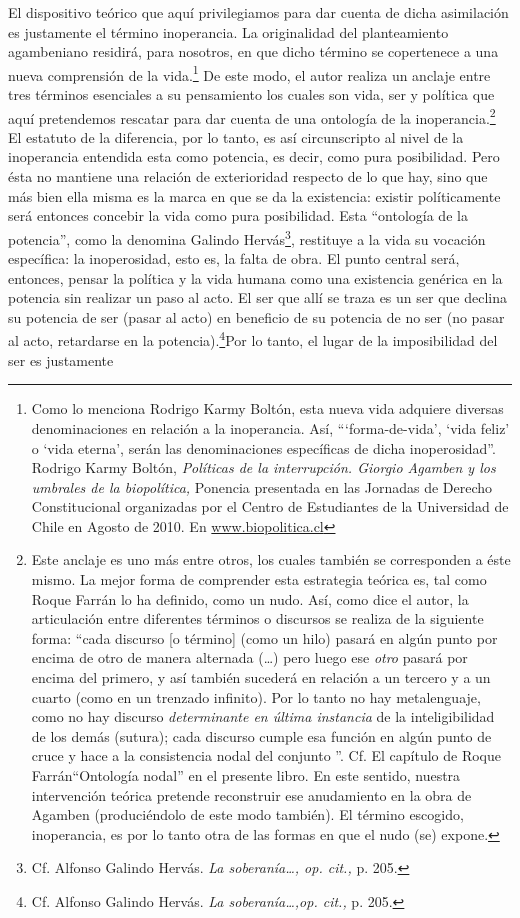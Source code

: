 El dispositivo teórico que aquí privilegiamos para dar cuenta de dicha asimilación es justamente el término inoperancia. La originalidad del planteamiento agambeniano residirá, para nosotros, en que dicho término se copertenece a una nueva comprensión de la vida.\footnote{Como lo menciona Rodrigo Karmy Boltón, esta nueva vida adquiere diversas denominaciones en relación a la inoperancia. Así, \enquote{\enquote{forma-de-vida}, \enquote{vida feliz} o \enquote{vida eterna}, serán las denominaciones específicas de dicha inoperosidad}. Rodrigo Karmy Boltón, \emph{Políticas de la interrupción. Giorgio Agamben y los umbrales de la biopolítica,} Ponencia presentada en las Jornadas de Derecho Constitucional organizadas por el Centro de Estudiantes de la Universidad de Chile en Agosto de 2010. En \href{http://www.biopolitica.cl/}{www.biopolitica.cl}} De este modo, el autor realiza un anclaje entre tres términos esenciales a su pensamiento los cuales son vida, ser y política que aquí pretendemos rescatar para dar cuenta de una ontología de la inoperancia.\footnote{Este anclaje es uno más entre otros, los cuales también se corresponden a éste mismo. La mejor forma de comprender esta estrategia teórica es, tal como Roque Farrán lo ha definido, como un nudo. Así, como dice el autor, la articulación entre diferentes términos o discursos se realiza de la siguiente forma: \enquote{cada discurso {[}o término{]} (como un hilo) pasará en algún punto por encima de otro de manera alternada (\dots) pero luego ese \emph{otro} pasará por encima del primero, y así también sucederá en relación a un tercero y a un cuarto (como en un trenzado infinito). Por lo tanto no hay metalenguaje, como no hay discurso \emph{determinante en última instancia} de la inteligibilidad de los demás (sutura); cada discurso cumple esa función en algún punto de cruce y hace a la consistencia nodal del conjunto }. Cf. El capítulo de Roque Farrán\enquote{Ontología nodal} en el presente libro. En este sentido, nuestra intervención teórica pretende reconstruir ese anudamiento en la obra de Agamben (produciéndolo de este modo también). El término escogido, inoperancia, es por lo tanto otra de las formas en que el nudo (se) expone.} El estatuto de la diferencia, por lo tanto, es así circunscripto al nivel de la inoperancia entendida esta como potencia, es decir, como pura posibilidad. Pero ésta no mantiene una relación de exterioridad respecto de lo que hay, sino que más bien ella misma es la marca en que se da la existencia: existir políticamente será entonces concebir la vida como pura posibilidad. Esta \enquote{ontología de la potencia}, como la denomina Galindo Hervás\footnote{Cf. Alfonso Galindo Hervás. \emph{La soberanía\ldots, op. cit.,} p. 205.}, restituye a la vida su vocación específica: la inoperosidad, esto es, la falta de obra. El punto central será, entonces, pensar la política y la vida humana como una existencia genérica en la potencia sin realizar un paso al acto. El ser que allí se traza es un ser que declina su potencia de ser (pasar al acto) en beneficio de su potencia de no ser (no pasar al acto, retardarse en la potencia).\footnote{Cf. Alfonso Galindo Hervás. \emph{La soberanía\ldots,op. cit.,} p. 205.}Por lo tanto, el lugar de la imposibilidad del ser  es justamente 